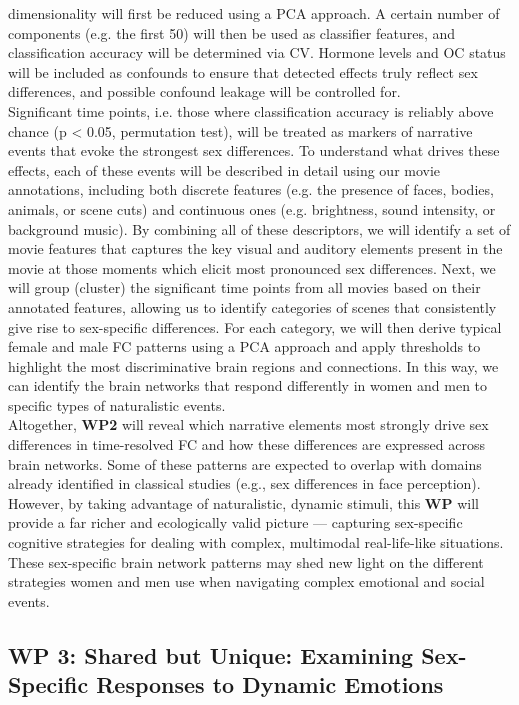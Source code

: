 \documentclass[11pt,a4paper]{article}
\begin{document}
dimensionality will first be reduced using a PCA approach. A certain number of components (e.g. the first 50) 
will then be used as classifier features, and classification accuracy will be determined via CV. Hormone levels and OC status will be
included as confounds to ensure that detected effects truly reflect 
sex differences, and possible confound leakage \parencite{hamdanConfoundleakageConfoundRemoval2022a} will be controlled for.\\
Significant time points, i.e. those where classification accuracy is reliably above chance (p < 0.05, permutation test), 
will be treated as markers of narrative events that evoke the strongest sex differences. To understand what drives these effects, 
each of these events will be described in detail using our movie annotations, including both discrete features 
(e.g. the presence of faces, bodies, animals, or scene cuts) and continuous ones (e.g. brightness, 
sound intensity, or background music). By combining all of these descriptors, we will identify a 
set of movie features that captures the key visual and auditory elements present in the movie at those moments which 
elicit most pronounced sex differences.
Next, we will group (cluster) the significant time points from all movies based on their annotated features, allowing us to 
identify categories of scenes that consistently give rise to sex-specific differences. For each category, we will then 
derive typical female and male FC patterns using a PCA approach and apply thresholds to highlight the most discriminative brain regions 
and connections. In this way, we can identify the brain networks that respond differently in women and men to specific 
types of naturalistic events.\\
Altogether, \textbf{WP2} will reveal which narrative elements most strongly drive sex differences in time-resolved FC and how 
these differences are expressed across brain networks. Some of these patterns are expected to overlap with domains already 
identified in classical studies (e.g., sex differences in face perception). However, by taking advantage of naturalistic, dynamic stimuli, 
this \textbf{WP} will provide a far richer and ecologically valid picture — capturing sex-specific cognitive strategies for dealing with 
complex, multimodal real-life-like situations. These sex-specific brain network patterns may shed new light on the 
different strategies women and men use when navigating complex emotional and social events.

\subsection*{WP 3: Shared but Unique: Examining Sex-Specific Responses to Dynamic Emotions}
\end{document}
